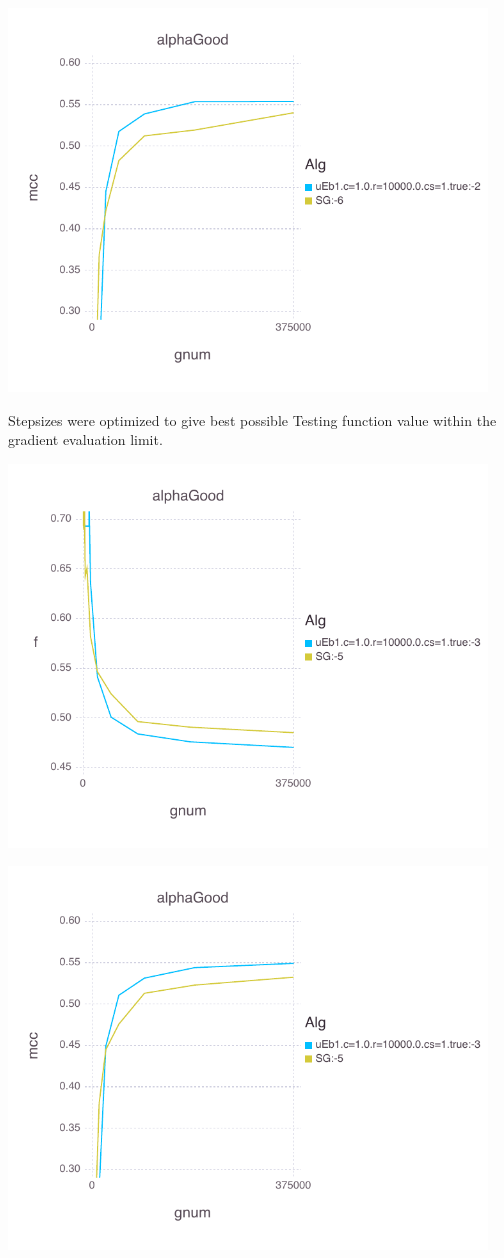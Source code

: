 \documentclass[11pt]{article}
\begin{document}
   \includegraphics[width= 5in]{Figures/alphaGoodBLtruemccWithSGglobal.pdf}
   
   Stepsizes were optimized to give best possible Testing function value within the gradient evaluation limit.
   

   \includegraphics[width= 5in]{Figures/alphaGoodBLtruefWithSGoverTen.pdf}
  
   \includegraphics[width= 5in]{Figures/alphaGoodBLtruemccWithSGoverTen.pdf}
   
\end{document}
